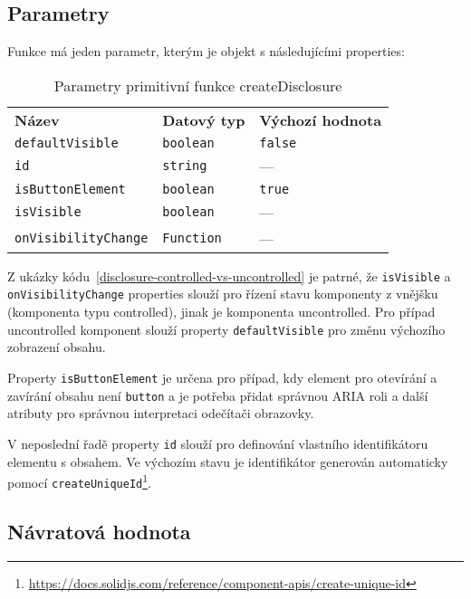 \subsection{Parametry}

Funkce má jeden parametr, kterým je objekt s následujícími properties:

\begin{table}[ht]\label{table:disclosure-params}
    \begin{ctucolortab}
        \begin{tabularx}{\textwidth}{X X X}
            \bfseries Název             & \bfseries Datový typ & \bfseries Výchozí hodnota \\\Midrule{}
            \texttt{defaultVisible}     & \texttt{boolean}     & \texttt{false}            \\
            \texttt{id}                 & \texttt{string}      & ---                       \\
            \texttt{isButtonElement}    & \texttt{boolean}     & \texttt{true}             \\
            \texttt{isVisible}          & \texttt{boolean}     & ---                       \\
            \texttt{onVisibilityChange} & \texttt{Function}    & ---
        \end{tabularx}
    \end{ctucolortab}
    \caption{Parametry primitivní funkce createDisclosure}
\end{table}

Z ukázky kódu~\ref{disclosure-controlled-vs-uncontrolled} je patrné, že \texttt{isVisible} a \texttt{onVisibilityChange} properties slouží pro řízení stavu komponenty z vnějšku (komponenta typu controlled), jinak je komponenta uncontrolled.
Pro případ uncontrolled komponent slouží property \texttt{defaultVisible} pro změnu výchozího zobrazení obsahu.

Property \texttt{isButtonElement} je určena pro případ, kdy element pro otevírání a zavírání obsahu není \texttt{button} a je potřeba přidat správnou ARIA roli a další atributy pro správnou interpretaci odečítači obrazovky.

V neposlední řadě property \texttt{id} slouží pro definování vlastního identifikátoru elementu s obsahem.
Ve výchozím stavu je identifikátor generován automaticky pomocí \texttt{createUniqueId}\footnote{\url{https://docs.solidjs.com/reference/component-apis/create-unique-id}}.

\subsection{Návratová hodnota}

